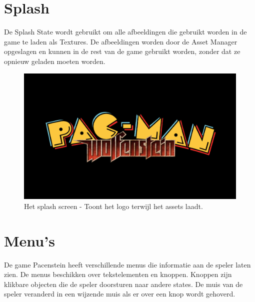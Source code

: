 \documentclass{report}
\begin{document}
  \section{Splash} %
  \label{sec:splash}
  De Splash State wordt gebruikt om alle afbeeldingen die gebruikt worden in de game te laden als Textures. De afbeeldingen worden door de Asset Manager opgeslagen en kunnen in de rest van de game gebruikt worden, zonder dat ze opnieuw geladen moeten worden.
  \begin{figure}[!ht]
    \centering
    \includegraphics[width=.95\textwidth]{technisch verslag imgs/splash.png}
    \caption{Het splash screen - Toont het logo terwijl het assets laadt.}
  \end{figure}

  \section{Menu's} %
  \label{sec:menu_s}
  De game Pacenstein heeft verschillende menus die informatie aan de speler laten zien. De menus beschikken over tekstelementen en knoppen. Knoppen zijn klikbare objecten die de speler doorsturen naar andere states. De muis van de speler veranderd in een wijzende muis als er over een knop wordt gehoverd.
\end{document}
